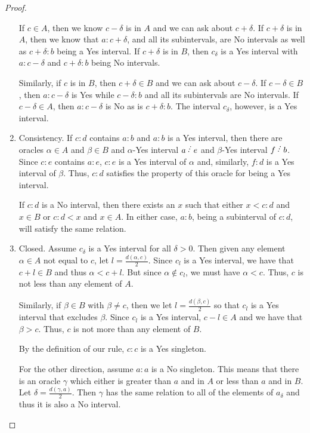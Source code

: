 \documentclass[12pt]{article}
\begin{document}
\begin{proof}
\begin{enumerate}
        If $c \in A$, then we know $c-\delta$ is in $A$ and we can ask about $c+\delta$. If $c+\delta$ is in $A$, then we know that $a:c+\delta$, and all its subintervals, are No intervals as well as $c+\delta:b$ being a Yes interval. If $c+\delta$ is in $B$, then $c_\delta$ is a Yes interval with $a:c-\delta$ and $c+\delta:b$ being No intervals. 

        Similarly, if $c$ is in $B$, then $c+\delta \in B$ and we can ask about $c-\delta$. If $c-\delta \in B$, then $a:c-\delta$ is Yes while $c-\delta:b$ and all its subintervals are No intervals. If $c-\delta \in A$, then $a:c-\delta$ is No as is $c+\delta:b$. The interval $c_\delta$, however, is a Yes interval. 
        
        \item Consistency. If $c:d$ contains $a:b$ and $a:b$ is a Yes interval, then there are oracles $\alpha \in A$ and $\beta \in B$ and $\alpha$-Yes interval $a \lte e$ and $\beta$-Yes interval $f \lte b$. Since $c:e$ contains $a:e$, $c:e$ is a Yes interval of $\alpha$ and, similarly, $f:d$ is a Yes interval of $\beta$. Thus, $c:d$ satisfies the property of this oracle for being a Yes interval. 

        If $c:d$ is a No interval, then there exists an $x$ such that either $x < c:d$ and $x \in B$ or $c:d < x$ and $x\in A$. In either case, $a:b$, being a subinterval of $c:d$, will satisfy the same relation. 
        \item Closed. Assume $c_\delta$ is a Yes interval for all $\delta > 0$. Then given any element $\alpha \in A$ not equal to $c$, let $l = \frac{d(\alpha, c)}{2}$. Since $c_l$ is a Yes interval, we have that $c+l \in B$ and thus $\alpha < c+l$. But since $\alpha \notin c_l$, we must have $\alpha < c$. Thus, $c$ is not less than any element of $A$. 
        
        Similarly, if $\beta \in B$ with $\beta \neq c$, then we let $l = \frac{d(\beta,c)}{2}$ so that $c_l$ is a Yes interval that excludes $\beta$. Since $c_l$ is a Yes interval, $c-l \in A$ and we have that $\beta > c$. Thus, $c$ is not more than any element of $B$.

        By the definition of our rule, $c:c$ is a Yes singleton. 

        For the other direction, assume $a:a$ is a No singleton. This means that there is an oracle $\gamma$  which either is greater than $a$ and in $A$ or less than $a$ and in $B$. Let $\delta = \frac{d(\gamma, a)}{2}$. Then $\gamma$ has the same relation to all of the elements of $a_\delta$ and thus it is also a No interval.  
    \end{enumerate}
    
\end{proof}
\end{document}
